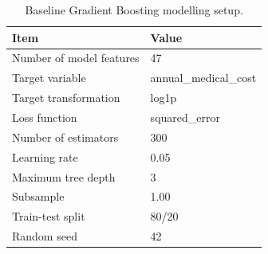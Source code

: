 \begin{table}
\caption{Baseline Gradient Boosting modelling setup.}
\label{tab:05-gb-feature-summary}
\begin{tabular}{ll}
\toprule
Item & Value \\
\midrule
Number of model features & 47 \\
Target variable & annual_medical_cost \\
Target transformation & log1p \\
Loss function & squared_error \\
Number of estimators & 300 \\
Learning rate & 0.05 \\
Maximum tree depth & 3 \\
Subsample & 1.00 \\
Train-test split & 80/20 \\
Random seed & 42 \\
\bottomrule
\end{tabular}
\end{table}
